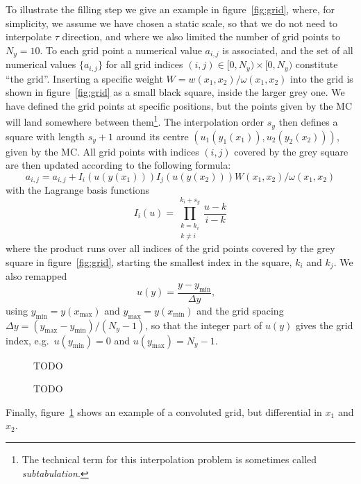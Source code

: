 To illustrate the filling step we give an example in figure~\ref{fig:grid}, where, for simplicity, we assume we have chosen a static scale, so that we do not need to interpolate $\tau$ direction, and where we also limited the number of grid points to $N_y = 10$.
To each grid point a numerical value $a_{i,j}$ is associated, and the set of all numerical values $\{ a_{i,j} \}$ for all grid indices $(i,j) \in [0,N_y) \times [0,N_y)$ constitute \enquote{the grid}.
Inserting a specific weight $W = w (x_1, x_2) / \omega(x_1, x_2)$ into the grid is shown in figure~\ref{fig:grid} as a small black square, inside the larger grey one.
We have defined the grid points at specific positions, but the points given by the MC will land somewhere between them\footnote{The technical term for this interpolation problem is sometimes called \emph{subtabulation}.}.
The interpolation order $s_y$ then defines a square with length $s_y + 1$ around its centre $(u_1(y_1(x_1)),u_2(y_2(x_2)))$, given by the MC.
All grid points with indices $(i,j)$ covered by the grey square are then updated according to the following formula:
\begin{equation}
a_{i,j} = a_{i,j} + I_i(u(y(x_1))) I_j(u(y(x_2))) W(x_1,x_2) / \omega(x_1,x_2)
\label{eq:interpolation}
\end{equation}
with the Lagrange basis functions
\begin{equation}
I_i (u) = \prod_{\substack{k=k_i \\ k \neq i}}^{k_i + s_y} \frac{u-k}{i-k}
\end{equation}
where the product runs over all indices of the grid points covered by the grey square in figure~\ref{fig:grid}, starting the smallest index in the square, $k_i$ and $k_j$.
We also remapped
\begin{equation}
u(y) = \frac{y-y_\text{min}}{\Delta y} \text{,} \quad
\end{equation}
using $y_\text{min} = y(x_\text{max})$ and $y_\text{max} = y(x_\text{min})$ and the grid spacing $\Delta y = (y_\text{max} - y_\text{min})/(N_y-1)$, so that the integer part of $u(y)$ gives the grid index, e.g.\ $u(y_\text{min}) = 0$ and $u(y_\text{max}) = N_y - 1$.

\begin{figure}
\centering
TODO
\caption{TODO}
\label{fig:example-grid}
\end{figure}

Finally, figure~\ref{fig:example-grid} shows an example of a convoluted grid, but differential in $x_1$ and $x_2$.

